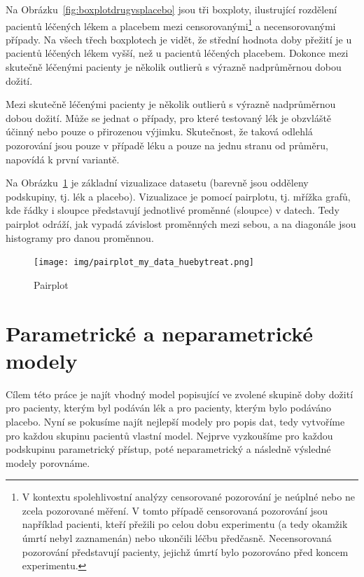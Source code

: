\documentclass[a4, 11pt]{article}
\theoremstyle{definition}
\theoremstyle{remark}
\begin{document}
	Na Obrázku~\ref{fig:boxplotdrugvsplacebo} jsou tři boxploty, ilustrující rozdělení pacientů léčených lékem a placebem mezi censorovanými\footnote{V kontextu spolehlivostní analýzy censorované pozorování je neúplné nebo ne zcela pozorované měření. V tomto případě censorovaná pozorování jsou například pacienti, kteří přežili po celou dobu experimentu (a tedy okamžik úmrtí nebyl zaznamenán) nebo ukončili léčbu předčasně. Necensorovaná pozorování představují pacienty, jejichž úmrtí bylo pozorováno před koncem experimentu.} a necensorovanými případy. 
	Na všech třech boxplotech je vidět, že střední hodnota doby přežití je u pacientů léčených lékem vyšší, než u pacientů léčených placebem. Dokonce mezi skutečně léčenými pacienty je několik outlierů s výrazně nadprůměrnou dobou dožití.
	 
	Mezi skutečně léčenými pacienty je několik outlierů s výrazně nadprůměrnou dobou dožití. Může se jednat o případy, pro které testovaný lék je obzvláště účinný nebo pouze o přirozenou výjimku. Skutečnost, že taková odlehlá pozorování jsou pouze v případě léku a pouze na jednu stranu od průměru, napovídá k první variantě.
	
	Na Obrázku~\ref{fig:pairplot_my_data} je základní vizualizace datasetu (barevně jsou odděleny podskupiny, tj. lék a placebo).
    Vizualizace je pomocí pairplotu, tj. mřížka grafů, kde řádky i sloupce představují jednotlivé proměnné (sloupce) v datech. Tedy pairplot odráží, jak vypadá závislost proměnných mezi sebou, a na diagonále jsou histogramy pro danou proměnnou.
	
	\begin{figure}[H]
		\centering
		\texttt{[image: img/pairplot\_my\_data\_huebytreat.png]}
		\caption{Pairplot}
		\label{fig:pairplot_my_data}
	\end{figure}
	

	\section{Parametrické a neparametrické modely}
    Cílem této práce je najít vhodný model popisující ve zvolené skupině doby dožití pro pacienty, kterým byl podáván lék a pro pacienty, kterým bylo podáváno placebo. 
	Nyní se pokusíme najít nejlepší modely pro popis dat, tedy vytvoříme pro každou skupinu pacientů vlastní model. Nejprve vyzkoušíme pro každou podskupinu parametrický přístup, poté neparametrický a následně výsledné modely porovnáme.
	
\end{document}
